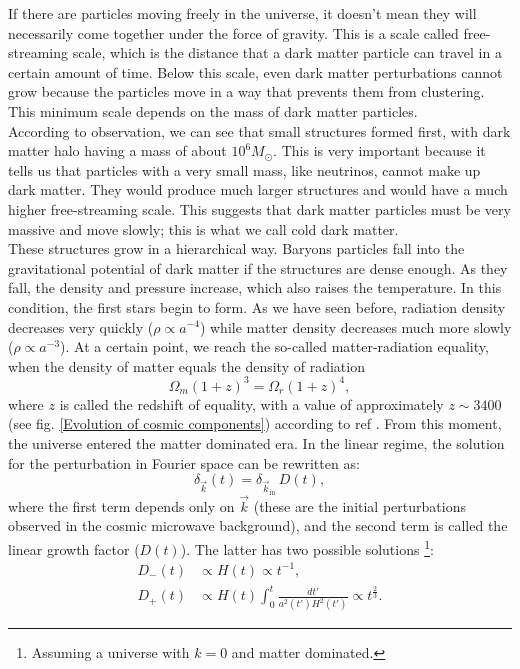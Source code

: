 If there are particles moving freely in the universe, it doesn't mean they will necessarily come together under the force of gravity. This is a scale called free-streaming scale, which is the distance that a dark matter particle can travel in a certain amount of time. Below this scale, even dark matter perturbations cannot grow because the particles move in a way that prevents them from clustering. This minimum scale depends on the mass of dark matter particles.\\ According to observation, we can see that small structures formed first, with dark matter halo having a mass of about $10^6 M_\odot$. This is very important because it tells us that particles with a very small mass, like neutrinos, cannot make up dark matter. They would produce much larger structures and would have a much higher free-streaming scale. This suggests that dark matter particles must be very massive and move slowly; this is what we call cold dark matter.\\ These structures grow in a hierarchical way. Baryons particles fall into the gravitational potential of dark matter if the structures are dense enough. As they fall, the density and pressure increase, which also raises the temperature. In this condition, the first stars begin to form.
As we have seen before, radiation density decreases very quickly ($\rho \propto a^{-4}$) while matter density decreases much more slowly ($\rho \propto a^{-3}$).
At a certain point, we reach the so-called matter-radiation equality, when the density of matter equals the density of radiation
\begin{equation}
    \Omega_m (1+z)^3 = \Omega_r (1+z)^4,
\end{equation}
where $z$ is called the redshift of equality, with a value of approximately $z \sim 3400$ (see fig. \ref{Evolution of cosmic components}) according to ref \cite{2024darkmatter}. From this moment, the universe entered the matter dominated era.
In the linear regime, the solution for the perturbation in Fourier space can be rewritten as:
\begin{equation}
    \delta_{\vec{k}} (t) = \delta_{\vec{k}_{\text{in}}} \, D(t),
\end{equation}
where the first term depends only on $\vec{k}$ (these are the initial perturbations observed in the cosmic microwave background), and the second term is called the linear growth factor ($D(t)$).
The latter has two possible solutions \footnote{Assuming a universe with $k=0$ and matter dominated.}:
\begin{equation}
\begin{split}
    D_{-} (t) &\propto H(t) \propto t^{-1},\\
    D_{+} (t) &\propto H(t) \int_{0} ^{t} \frac{dt'}{a^2(t') H^2(t')} \propto t^{\frac{2}{3}}.
\end{split}
\end{equation}
